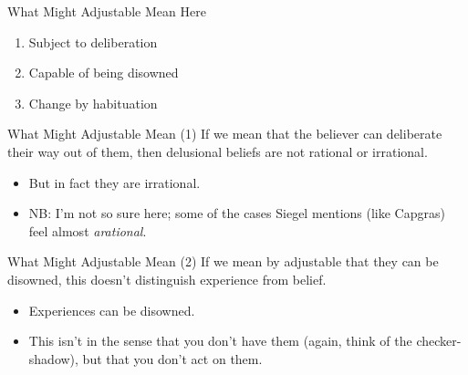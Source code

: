 \documentclass[
  17pt,
  letterpaper,
  ignorenonframetext,
  aspectratio=169,
  xcolor={dvipsnames}]{beamer}
\providecommand{\tightlist}{%
  \setlength{\itemsep}{0pt}\setlength{\parskip}{0pt}}\usepackage{longtable,booktabs,array}
\begin{document}
\begin{frame}{What Might Adjustable Mean Here}
\protect\hypertarget{what-might-adjustable-mean-here}{}
\begin{enumerate}[<+->]
\tightlist
\item
  Subject to deliberation
\item
  Capable of being disowned
\item
  Change by habituation
\end{enumerate}
\end{frame}

\begin{frame}{What Might Adjustable Mean (1)}
\protect\hypertarget{what-might-adjustable-mean-1}{}
If we mean that the believer can deliberate their way out of them, then
delusional beliefs are not rational or irrational.

\begin{itemize}[<+->]
\tightlist
\item
  But in fact they are irrational.
\item
  NB: I'm not so sure here; some of the cases Siegel mentions (like
  Capgras) feel almost \emph{arational}.
\end{itemize}
\end{frame}

\begin{frame}{What Might Adjustable Mean (2)}
\protect\hypertarget{what-might-adjustable-mean-2}{}
If we mean by adjustable that they can be disowned, this doesn't
distinguish experience from belief.

\begin{itemize}[<+->]
\tightlist
\item
  Experiences can be disowned.
\item
  This isn't in the sense that you don't have them (again, think of the
  checker-shadow), but that you don't act on them.
\end{itemize}
\end{frame}
\end{document}
